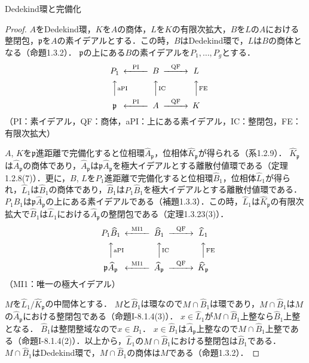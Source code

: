 \begin{screen}
    Dedekind環と完備化
\end{screen}
\begin{proof}
  $A$をDedekind環，$K$を$A$の商体，$L$を$K$の有限次拡大，$B$を$L$の$A$における整閉包，$\mathfrak{p}$を$A$の素イデアルとする．この時，$B$はDedekind環で，$L$は$B$の商体となる（命題1.3.2）．
  $\mathfrak{p}$の上にある$B$の素イデアルを$P_1,\ldots,P_g$とする．
  \[
  \begin{CD}
    P_1            @<\text{PI}<< B @>\text{QF}>> L\\
    @AA\text{aPI}A @AA\text{IC}A   @AA\text{FE}A \\
    \mathfrak{p}   @<\text{PI}<< A @>\text{QF}>> K
  \end{CD}
  \]
  （PI：素イデアル，QF：商体，aPI：上にある素イデアル，IC：整閉包，FE：有限次拡大）

  $A$, $K$を$\mathfrak{p}$進距離で完備化すると位相環$\widehat{A}_\mathfrak{p}$，位相体$\widehat{K}_\mathfrak{p}$が得られる（系1.2.9）．
  $\widehat{K}_\mathfrak{p}$は$\widehat{A}_\mathfrak{p}$の商体であり，$\widehat{A}_\mathfrak{p}$は$\mathfrak{p}\widehat{A}_\mathfrak{p}$を極大イデアルとする離散付値環である（定理1.2.8(7)）．更に，$B$, $L$を$P_1$進距離で完備化すると位相環$\widehat{B}_1$，位相体$\widehat{L}_1$が得られ，$\widehat{L}_1$は$\widehat{B}_1$の商体であり，$\widehat{B}_1$は$P_1\widehat{B}_1$を極大イデアルとする離散付値環である．
  $P_1\widehat{B}_1$は$\mathfrak{p}\widehat{A}_\mathfrak{p}$の上にある素イデアルである（補題1.3.3）．この時，$\widehat{L}_1$は$\widehat{K}_\mathfrak{p}$の有限次拡大で$\widehat{B}_1$は$\widehat{L}_1$における$\widehat{A}_\mathfrak{p}$の整閉包である（定理1.3.23(3)）．
  \[
  \begin{CD}
    P_1\widehat{B}_1                     @<\text{MI1}<< \widehat{B}_1            @>\text{QF}>> \widehat{L}_1\\
    @AA\text{aPI}A                   @AA\text{IC}A                      @AA\text{FE}A \\
    \mathfrak{p}\widehat{A}_\mathfrak{p} @<\text{MI1}<< \widehat{A}_\mathfrak{p} @>\text{QF}>> \widehat{K}_\mathfrak{p}
  \end{CD}
  \]
  （MI1：唯一の極大イデアル）

  $M$を$\widehat{L}_1/\widehat{K}_\mathfrak{p}$の中間体とする．
  $M$と$\widehat{B}_1$は環なので$M\cap\widehat{B}_1$は環であり，$M\cap\widehat{B}_1$は$M$の$\widehat{A}_\mathfrak{p}$における整閉包である（命題I-8.1.4(3)）．
  $x\in\widehat{L}_1$が$M\cap\widehat{B}_1$上整なら$\widehat{B}_1$上整となる．
  $\widehat{B}_1$は整閉整域なので$x\in\widehat{B}_1$．
  $x\in\widehat{B}_1$は$\widehat{A}_\mathfrak{p}$上整なので$M\cap\widehat{B}_1$上整である（命題I-8.1.4(2)）．以上から，$\widehat{L}_1$の$M\cap\widehat{B}_1$における整閉包は$\widehat{B}_1$である．
  $M\cap\widehat{B}_1$はDedekind環で，$M\cap\widehat{B}_1$の商体は$M$である（命題1.3.2）．


\end{proof}
